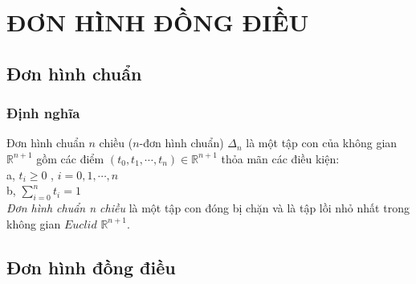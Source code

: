 \chapter{ĐƠN HÌNH ĐỒNG ĐIỀU}
\section{Đơn hình chuẩn}
\subsection[Định nghĩa]{Định nghĩa}
\indent Đơn hình chuẩn \(n\) chiều (\(n\)-đơn hình chuẩn)  \(\Delta_n\) là một tập con của không gian \(\mathds{R}^{n+1}\) gồm các điểm \((t_0, t_1,\cdots, t_n) \in \mathds{R}^{n+1}\) thỏa mãn các điều kiện: \\
\indent a, \(t_i \geq 0\) , \(i = 0,1,\cdots,n\) \\
\indent b, \(\sum_{i=0}^{n}t_i=1\) \\
\indent \emph{Đơn hình chuẩn n chiều} là một tập con đóng bị chặn và là tập lồi nhỏ nhất trong không gian \(Euclid\) \(\mathds{R}^{n+1}\).

\section{Đơn hình đồng điều}
